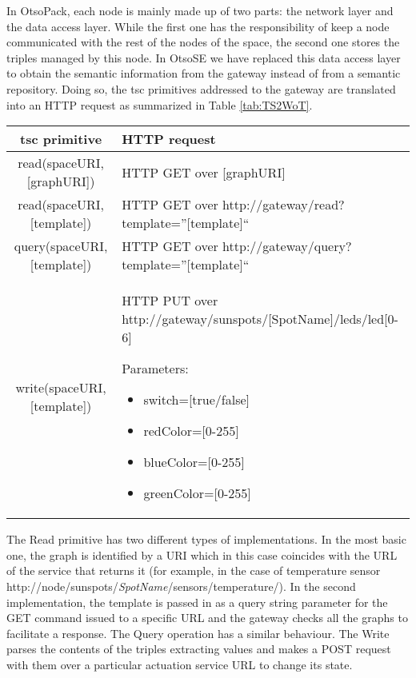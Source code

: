 In OtsoPack, each node is mainly made up of two parts: the network layer and the data access layer. While the first one has the responsibility of
keep a node communicated with the rest of the nodes of the space, the second one stores the triples managed by this node.
In OtsoSE we have replaced this data access layer to obtain the semantic information from the gateway instead of from a semantic repository.
Doing so, the \ac{tsc} primitives addressed to the gateway are translated into an HTTP request as summarized in Table \ref{tab:TS2WoT}.
\begin{table*}[t!] %
\centering
\caption {Mappings between OtsoPack's primitives and HTTP requests addressed to a \ac{wot} solution.}
\begin{tabular}{|c|p{10cm}|}
\hline
\acs{tsc} primitive & HTTP request \\
\hline \hline
read(spaceURI,[graphURI]) & HTTP GET over [graphURI] \\
\hline
read(spaceURI,[template]) & HTTP GET over http://gateway/read?template={''[template]``} \\
\hline
query(spaceURI,[template]) & HTTP GET over http://gateway/query?template={''[template]``}\\
\hline
write(spaceURI,[template]) & HTTP PUT over http://gateway/sunspots/[SpotName]/leds/led[0-6]

Parameters:
\begin{itemize}
  \item switch=[true/false]
  \item redColor=[0-255]
  \item blueColor=[0-255]
  \item greenColor=[0-255]
\end{itemize}

\\
\hline
\end{tabular}
\label{tab:TS2WoT}
\end{table*}

The Read primitive has two different types of implementations. In the most basic one, the graph is identified by a URI which in this case
coincides with the URL of the service that returns it (for example, in the case of temperature sensor
http://node/sunspots/\textit{SpotName}/sensors/temperature/). In the second implementation, the template is passed in as a query string parameter for
the GET command issued to a specific URL and the gateway checks all the graphs to facilitate a response. The Query operation has a similar behaviour.
The Write parses the contents of the triples extracting values and makes a POST request with them over a particular actuation service URL to change
its state.


